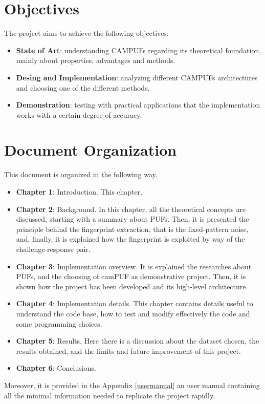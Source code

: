 \section {Objectives}
The project aims to achieve the following objectives:
\begin{itemize}
    \item \textbf{State of Art}: understanding CAMPUFs regarding its theoretical foundation, mainly about properties, advantages and methods.
    

    \item \textbf{Desing and Implementation}: analyzing different CAMPUFs architectures and choosing one of the different methods.
    
    
    \item \textbf{Demonstration}: testing with practical applications that the implementation works with a certain degree of accuracy.

\end{itemize}

\section {Document Organization}
This document is organized in the following way.
\begin{itemize}
\item \textbf{Chapter 1}: Introduction. This chapter.
\item \textbf{Chapter 2}: Background. In this chapter, all the theoretical concepts are discussed, starting with a summary about PUFs. Then, it is presented the principle behind the fingerprint extraction, that is the fixed-pattern noise, and, finally, it is explained how the fingerprint is exploited by way of the challenge-response pair.
\item \textbf{Chapter 3}: Implementation overview. It is explained the researches about PUFs, and the choosing of camPUF as demonstrative project. Then, it is shown how the project has been developed and its high-level architecture.
\item \textbf{Chapter 4}: Implementation details. This chapter contains details useful to understand the code base, how to test and modify effectively the code and some programming choices.
\item \textbf{Chapter 5}: Results. Here there is a discussion about the dataset chosen, the results obtained, and the limits and future improvement of this project.
\item \textbf{Chapter 6}: Conclusions.
\end{itemize}
Moreover, it is provided in the Appendix \ref{usermanual} an user manual containing all the minimal information needed to replicate the project rapidly.
